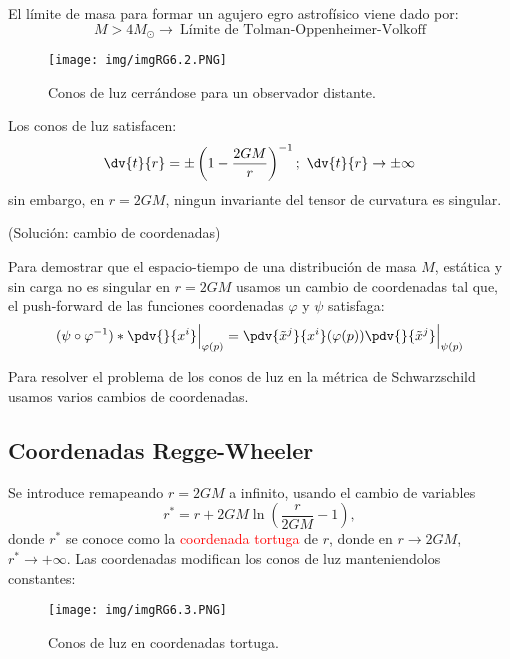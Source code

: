 \documentclass[../main]{subfiles}
\begin{document}
\begin{adjustwidth}{0pt}{-100pt}
El límite de masa para formar un agujero egro astrofísico viene dado por:
\begin{equation}
    M>4M_{\odot} \rightarrow \ \text{Límite de Tolman-Oppenheimer-Volkoff}
\end{equation}

\begin{figure}[H]
    \begin{adjustwidth}{0pt}{-100pt}
    \centering
    \texttt{[image: img/imgRG6.2.PNG]}
    \caption{Conos de luz cerrándose para un observador distante.}
    \end{adjustwidth}
\end{figure}

Los conos de luz satisfacen:
\begin{equation}
    \dv{t}{r}=\pm\left(1-\dfrac{2GM}{r}\right)^{-1};\ \dv{t}{r}\rightarrow \pm \infty
\end{equation}
sin embargo, en $r=2GM$, ningun invariante del tensor de curvatura es singular. 

(Solución: cambio de coordenadas)

Para demostrar que el espacio-tiempo de una distribución de masa $M$, estática y sin carga no es singular en $r=2GM$ usamos un cambio de coordenadas tal que, el push-forward de las funciones coordenadas $\varphi$ y $\psi$ satisfaga:
\begin{equation}
    (\psi \circ \varphi^{-1})* \pdv{}{x^{i}}\Big{|}_{\varphi(p)}=\pdv{\tilde{x}^j}{x^{i}}(\varphi(p))\pdv{}{\tilde{x}^j}\Big{|}_{\psi(p)}
\end{equation}

Para resolver el problema de los conos de luz en la métrica de Schwarzschild usamos varios cambios de coordenadas.

\subsection{Coordenadas Regge-Wheeler}

Se introduce remapeando $r=2GM$ a infinito, usando el cambio de variables
\begin{equation}
    r^*=r+2GM\ln\left(\dfrac{r}{2GM}-1\right),
\end{equation}
donde $r^*$ se conoce como la \textcolor{red}{coordenada tortuga} de $r$, donde en $r\rightarrow 2GM$, $r^* \rightarrow +\infty$. Las coordenadas modifican los conos de luz manteniendolos constantes:
\begin{figure}[H]
    \begin{adjustwidth}{0pt}{-100pt}
    \begin{center}
        \texttt{[image: img/imgRG6.3.PNG]}
        \caption{Conos de luz en coordenadas tortuga.}
    \end{center}
    \end{adjustwidth}
\end{figure}


\end{adjustwidth}
\end{document}
